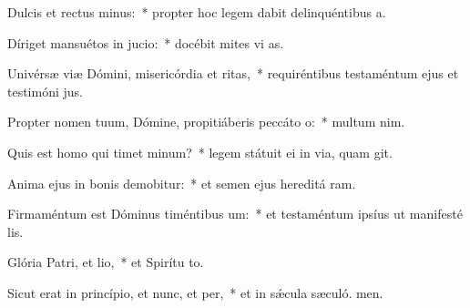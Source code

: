 \item Dulcis et rectus minus:~* propter hoc legem dabit delinquéntibus  a.
\item Díriget mansuétos in jucio:~* docébit mites vi as.
\item Univérsæ viæ Dómini, misericórdia et ritas,~* requiréntibus testaméntum ejus et testimóni jus.
\item Propter nomen tuum, Dómine, propitiáberis peccáto o:~* multum  nim.
\item Quis est homo qui timet minum?~* legem státuit ei in via, quam git.
\item Anima ejus in bonis demobitur:~* et semen ejus hereditá ram.
\item Firmaméntum est Dóminus timéntibus um:~* et testaméntum ipsíus ut manifesté lis.
\item Glória Patri, et lio,~* et Spirítu to.
\item Sicut erat in princípio, et nunc, et per,~* et in sǽcula sæculó. men.
